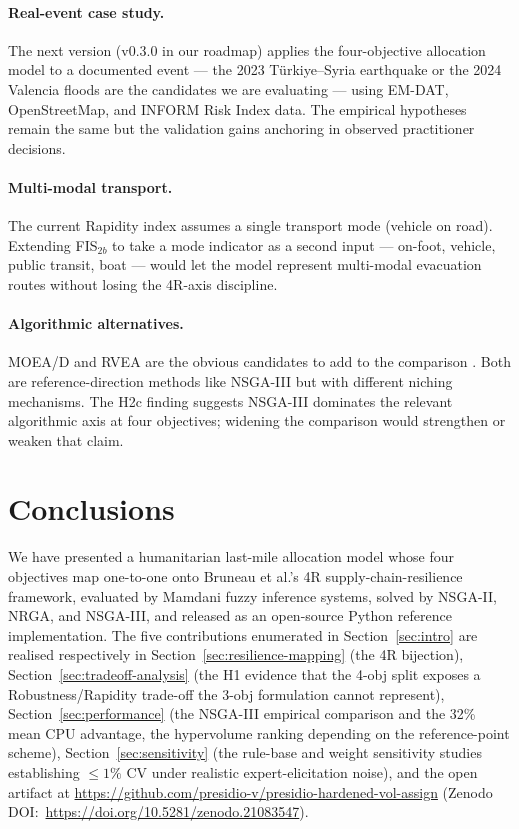\documentclass[applsci,article,submit,moreauthors,pdftex]{Definitions/mdpi}
\begin{document}
\paragraph{Real-event case study.} The next version (v0.3.0 in our
roadmap) applies the four-objective allocation model to a documented
event --- the 2023 T\"urkiye--Syria earthquake or the 2024 Valencia
floods are the candidates we are evaluating --- using EM-DAT,
OpenStreetMap, and INFORM Risk Index data. The empirical hypotheses
remain the same but the validation gains anchoring in observed
practitioner decisions.

\paragraph{Multi-modal transport.} The current Rapidity index assumes a
single transport mode (vehicle on road). Extending FIS$_{2b}$ to take a
mode indicator as a second input --- on-foot, vehicle, public transit,
boat --- would let the model represent multi-modal evacuation routes
without losing the 4R-axis discipline.

\paragraph{Algorithmic alternatives.} MOEA/D and RVEA are the obvious
candidates to add to the comparison \cite{deb2014nsga3}. Both are
reference-direction methods like NSGA-III but with different niching
mechanisms. The H2c finding suggests NSGA-III dominates the relevant
algorithmic axis at four objectives; widening the comparison would
strengthen or weaken that claim.

\section{Conclusions}\label{sec:conclusion}

We have presented a humanitarian last-mile allocation model whose four
objectives map one-to-one onto Bruneau et al.'s 4R supply-chain-resilience
framework, evaluated by Mamdani fuzzy inference systems, solved by
NSGA-II, NRGA, and NSGA-III, and released as an open-source Python
reference implementation. The five contributions enumerated in
Section~\ref{sec:intro} are realised respectively in
Section~\ref{sec:resilience-mapping} (the 4R bijection),
Section~\ref{sec:tradeoff-analysis} (the H1 evidence that the 4-obj split
exposes a Robustness/Rapidity trade-off the 3-obj formulation cannot
represent),
Section~\ref{sec:performance} (the NSGA-III empirical comparison and the
32\% mean CPU advantage, the hypervolume ranking depending on the
reference-point scheme),
Section~\ref{sec:sensitivity} (the rule-base and weight sensitivity
studies establishing $\le 1\%$ CV under realistic expert-elicitation
noise), and the open artifact at
\url{https://github.com/presidio-v/presidio-hardened-vol-assign}
(Zenodo DOI:~\url{https://doi.org/10.5281/zenodo.21083547}).
\end{document}
